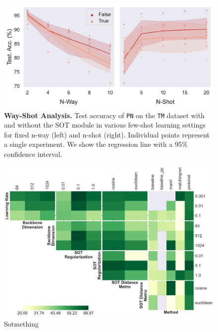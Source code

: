 \begin{figure}[h!]
    \centering
    \includegraphics[width=1\columnwidth]{figures/way-shot.pdf}
    \caption{\textbf{Way-Shot Analysis.} Test accuracy of \texttt{PN} on the \texttt{TM} dataset with and without the SOT module in various 
    few-shot learning settings for fixed n-way (left) and n-shot (right). Individual points represent a single experiment. We show the regression line with a 95\% confidence interval.}
    \label{fig:way-shot}
\end{figure}


\begin{figure}[h!]
    \centering
    \includegraphics[width=1\columnwidth]{figures/hparams-swissprot-grid.pdf}
    \caption{Sotmething}
\end{figure}